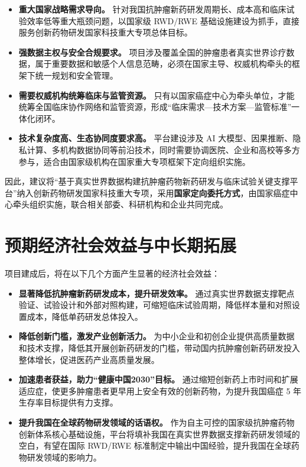 \documentclass[12pt, a4paper, fontset=mac]{ctexart} %
\begin{document}
\begin{itemize}
  \item \textbf{重大国家战略需求导向。} 针对我国抗肿瘤新药研发周期长、成本高和临床试验效率低等重大瓶颈问题，以国家级 RWD/RWE 基础设施建设为抓手，直接服务创新药物研发国家科技重大专项总体目标。
  \item \textbf{强数据主权与安全合规要求。} 项目涉及覆盖全国的肿瘤患者真实世界诊疗数据，属于重要数据和敏感个人信息范畴，必须在国家主导、权威机构牵头的框架下统一规划和安全管理。
  \item \textbf{需要权威机构统筹临床与监管资源。} 只有以国家癌症中心为牵头单位，才能统筹全国临床协作网络和监管资源，形成“临床需求—技术方案—监管标准”一体化闭环。
  \item \textbf{技术复杂度高、生态协同度要求高。} 平台建设涉及 AI 大模型、因果推断、隐私计算、多机构数据协同等前沿技术，同时需要协调医院、企业和高校等多方参与，适合由国家级机构在国家重大专项框架下定向组织实施。
\end{itemize}

因此，建议将“基于真实世界数据构建抗肿瘤药物新药研发与临床试验关键支撑平台”纳入创新药物研发国家科技重大专项，采用\textbf{国家定向委托方式}，由国家癌症中心牵头组织实施，联合相关部委、科研机构和企业共同完成。

\section{预期经济社会效益与中长期拓展}

项目建成后，将在以下几个方面产生显著的经济社会效益：

\begin{itemize}
  \item \textbf{显著降低抗肿瘤新药研发成本，提升研发效率。} 通过真实世界数据支撑靶点验证、试验设计和外部对照构建，可缩短临床试验周期，降低样本量和对照设置成本，降低单药研发总体投入。
  \item \textbf{降低创新门槛，激发产业创新活力。} 为中小企业和初创企业提供高质量数据和技术支撑，降低其开展创新药研发的门槛，带动国内抗肿瘤创新药研发投入整体增长，促进医药产业高质量发展。
  \item \textbf{加速患者获益，助力“健康中国2030”目标。} 通过缩短创新药上市时间和扩展适应症，使更多肿瘤患者更早用上安全有效的创新药物，为提升我国癌症 5 年生存率目标提供有力支撑。
  \item \textbf{提升我国在全球药物研发领域的话语权。} 作为自主可控的国家级抗肿瘤药物创新体系核心基础设施，平台将填补我国在真实世界数据支撑新药研发领域的空白，有望在国际 RWD/RWE 标准制定中输出中国经验，提升我国在全球药物研发领域的影响力。
\end{itemize}
\end{document}
